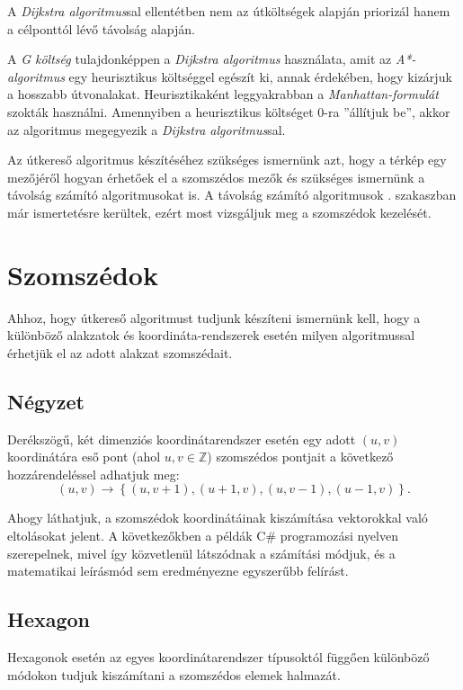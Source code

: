 A \textit{Dijkstra algoritmus}sal ellentétben nem az útköltségek alapján priorizál hanem a célponttól lévő távolság alapján.

A \textit{G költség} tulajdonképpen a \textit{Dijkstra algoritmus} használata, amit az \textit{A*-algo\-rit\-mus} egy heurisztikus költséggel egészít ki, annak érdekében, hogy kizárjuk a hosszabb útvonalakat. Heurisztikaként leggyakrabban a \textit{Manhattan-formulát} szokták használni. Amennyiben a heurisztikus költséget 0-ra ''állítjuk be'', akkor az algoritmus megegyezik a \textit{Dijkstra algoritmus}sal.

Az útkereső algoritmus készítéséhez szükséges ismernünk azt, hogy a térkép egy mezőjéről hogyan érhetőek el a szomszédos mezők és szükséges ismernünk a távolság számító algoritmusokat is. A távolság számító algoritmusok . szakaszban már ismertetésre kerültek, ezért most vizsgáljuk meg a szomszédok kezelését.

\section{Szomszédok}

Ahhoz, hogy útkereső algoritmust tudjunk készíteni ismernünk kell, hogy a különböző alakzatok és koordináta-rendszerek esetén milyen algoritmussal érhetjük el az adott alakzat szomszédait. 

\subsection{Négyzet}

Derékszögű, két dimenziós koordinátarendszer esetén egy adott $(u, v)$ koordinátára eső pont (ahol $u, v \in \mathbb{Z}$) szomszédos pontjait a következő hozzárendeléssel adhatjuk meg:
$$
(u, v) \rightarrow
\left\{
(u, v+1), (u+1, v), (u, v-1), (u-1, v)
\right\}.
$$

Ahogy láthatjuk, a szomszédok koordinátáinak kiszámítása vektorokkal való eltolásokat jelent. A következőkben a példák C\# programozási nyelven szerepelnek, mivel így közvetlenül látszódnak a számítási módjuk, és a matematikai leírásmód sem eredményezne egyszerűbb felírást.

\subsection{Hexagon}

Hexagonok esetén az egyes koordinátarendszer típusoktól függően különböző módokon tudjuk kiszámítani a szomszédos elemek halmazát.

